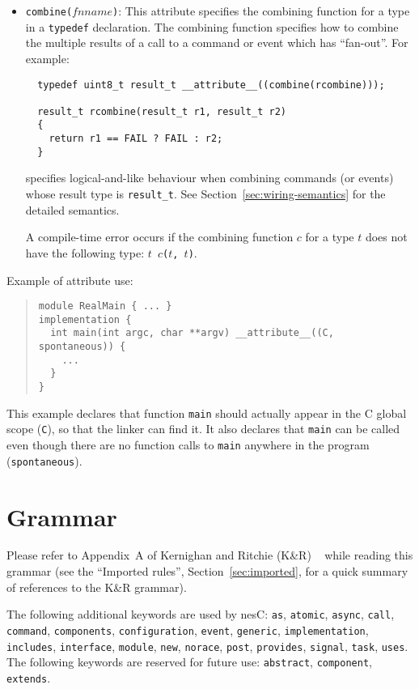 \documentclass[11pt,letterpaper]{article}
\newcommand{\kw}[1]{{\tt #1}}
\newcommand{\code}[1]{{\tt #1}}
\newcommand{\nesc}{nesC\xspace}
\begin{document}
\begin{itemize}
\item \code{combine($fnname$)}: This attribute specifies the combining
function for a type in a \kw{typedef} declaration. The combining function
specifies how to combine the multiple results of a call to a command
or event which has ``fan-out''. For example:
\begin{verbatim}
  typedef uint8_t result_t __attribute__((combine(rcombine)));

  result_t rcombine(result_t r1, result_t r2)
  {
    return r1 == FAIL ? FAIL : r2;
  }
\end{verbatim}
specifies logical-and-like behaviour when combining commands (or events)
whose result type is \code{result\_t}. See
Section~\ref{sec:wiring-semantics} for the detailed semantics.

A compile-time error occurs if the combining function $c$ for a type $t$
does not have the following type: \code{$t$ $c$($t$, $t$)}.

\end{itemize}

Example of attribute use:
\begin{quote} \begin{verbatim}
module RealMain { ... }
implementation {
  int main(int argc, char **argv) __attribute__((C, spontaneous)) {
    ...
  }
}
\end{verbatim} \end{quote}

This example declares that function \code{main} should actually appear
in the C global scope (\code{C}), so that the linker can find it. It
also declares that \code{main} can be called even though there are no
function calls to \code{main} anywhere in the program
(\code{spontaneous}). 

\appendix

\section{Grammar}
\label{sec:grammar}

Please refer to Appendix~A of Kernighan and Ritchie (K\&R)
~\cite[pp234--239]{kandr} while reading this grammar (see the ``Imported
rules'', Section~\ref{sec:imported}, for a quick summary of references to
the K\&R grammar).

The following additional keywords are used by \nesc: \kw{as}, \kw{atomic},
\kw{async}, \kw{call}, \kw{command}, \kw{components}, \kw{configuration},
\kw{event}, \kw{generic}, \kw{implementation}, \kw{includes},
\kw{interface}, \kw{module}, \kw{new}, \kw{norace}, \kw{post},
\kw{provides}, \kw{signal}, \kw{task}, \kw{uses}. The following keywords
are reserved for future use: \kw{abstract}, \kw{component}, \kw{extends}.
\end{document}
